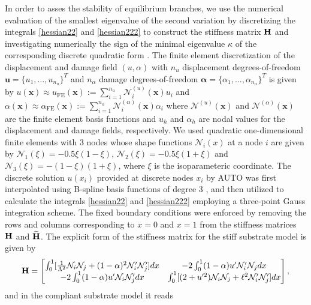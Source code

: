 In order to asses the stability of equilibrium branches, we use  the numerical evaluation of the smallest eigenvalue of the second variation by discretizing the integrals \eqref{hessian22} and   \eqref{hessian222} to construct the stiffness matrix
$\mathbf{H}$ and investigating numerically the sign of the minimal eigenvalue $\kappa$ of the corresponding discrete quadratic form \cite{Sanderson2016-ht}.  The finite element discretization of the displacement and damage field $(u, \alpha )$     with \( n_u \) displacement degrees-of-freedom 
$
\mathbf{u} = \{ u_1, \ldots, u_{n_u} \}^T 
$
and \( n_\alpha \) damage degrees-of-freedom 
$
\boldsymbol{\alpha} = \{ \alpha_1, \ldots, \alpha_{n_\alpha} \}^T
$ is given by 
$
u(\mathbf{x}) \approx u_{\text{FE}} (\mathbf{x}) := \sum_{i=1}^{n_u} \mathcal{N}^{(u)}_i(\mathbf{x}) u_i $
and $\alpha(\mathbf{x}) \approx \alpha_{\text{FE}} (\mathbf{x}) := \sum_{i=1}^{n_\alpha} \mathcal{N}^{(\alpha)}_i (\mathbf{x}) \alpha_i 
$
where $\mathcal{N}^{(u)}(\mathbf{x}) $ and $\mathcal{N}^{(\alpha)}(\mathbf{x}) $ are the finite element basis functions and  $u_h$ and  $\alpha_h$ are nodal values for the displacement and damage fields, respectively. We used quadratic one-dimensional finite elements with 3 nodes  whose   shape functions   ${\mathcal N}_i(x)$ at a node $i$  are given by ${\mathcal N}_1(\xi)=-0.5\xi(1-\xi)$, ${\mathcal N}_2(\xi)=-0.5\xi(1+\xi)$ and ${\mathcal N}_3(\xi)=-(1-\xi)(1+\xi)$, where $\xi$ is the isoparameteric coordinate. The discrete solution $u(x_i)$ provided at discrete nodes $x_i$ by AUTO was first interpolated using B-spline basis functions of degree 3 \cite{Grimstad2016-cq}, and then utilized to calculate the integrals \eqref{hessian22} and   \ref{hessian222} employing a three-point Gauss integration scheme. The fixed boundary conditions were enforced by removing the rows and columns corresponding to $x = 0$ and $x = 1$ from the stiffness matrices 
$\mathbf{H}$ and $\widetilde{\mathbf{H}}$. The explicit form of the stiffness matrix for the stiff substrate model is given by
\begin{equation}
    \mathbf{H} = 
    \begin{bmatrix}
\int_0^1[ \frac{1}{\Lambda^2}{\mathcal N}_i{\mathcal N}_j + (1-\alpha)^2{\mathcal N}'_i{\mathcal N}'_j
] dx&
-2\int_0^1(1-\alpha)u' {\mathcal N}'_i {\mathcal N}_j  dx\\
-2\int_0^1(1-\alpha)u' {\mathcal N}_i {\mathcal N}'_j dx
& \int_0^1 [ (2+u'^2){\mathcal N}_i{\mathcal N}_j +\ell^2{\mathcal N}'_i{\mathcal N}'_j] dx
\end{bmatrix},
\label{eq:stifness1}
\end{equation}
and in the compliant substrate model it reads

